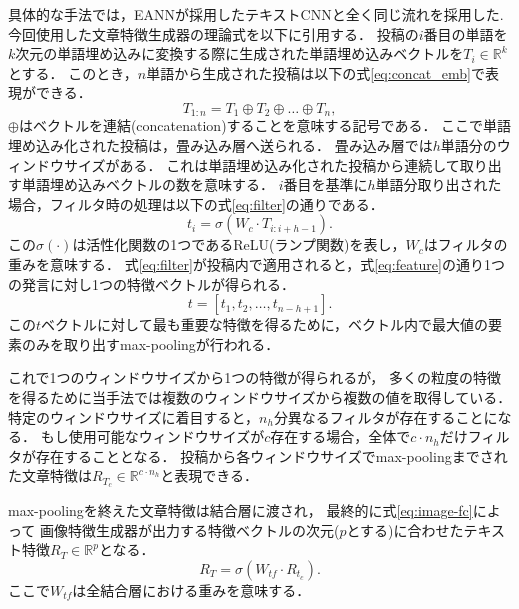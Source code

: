 具体的な手法では，EANNが採用したテキストCNNと全く同じ流れを採用した\cite{Wang:2018:EEA:3219819.3219903}.
今回使用した文章特徴生成器の理論式を以下に引用する．
投稿の$i$番目の単語を$k$次元の単語埋め込みに変換する際に生成された単語埋め込みベクトルを$T_i \in \mathbb{R}^k$とする．
このとき，$n$単語から生成された投稿は以下の式\ref{eq:concat_emb}で表現ができる．
\begin{equation}
    \label{eq:concat_emb}
    T_{1:n} = T_1 \oplus T_2 \oplus \ldots \oplus T_n,
\end{equation}
$\oplus$はベクトルを連結(concatenation)することを意味する記号である．
ここで単語埋め込み化された投稿は，畳み込み層へ送られる．
畳み込み層では$h$単語分のウィンドウサイズがある．
これは単語埋め込み化された投稿から連続して取り出す単語埋め込みベクトルの数を意味する．
$i$番目を基準に$h$単語分取り出された場合，フィルタ時の処理は以下の式\ref{eq:filter}の通りである．
\begin{equation}
    \label{eq:filter}
    t_i = \sigma(W_c \cdot T_{i:i+h-1}).
\end{equation}
この$\sigma(\cdot)$は活性化関数の1つであるReLU(ランプ関数)を表し，$W_c$はフィルタの重みを意味する．
式\ref{eq:filter}が投稿内で適用されると，式\ref{eq:feature}の通り1つの発言に対し1つの特徴ベクトルが得られる．
\begin{equation}
    \label{eq:feature}
    t = [t_1, t_2, \ldots, t_{n-h+1}].
\end{equation}
この$t$ベクトルに対して最も重要な特徴を得るために，ベクトル内で最大値の要素のみを取り出すmax-poolingが行われる．

これで1つのウィンドウサイズから1つの特徴が得られるが，
多くの粒度の特徴を得るために当手法では複数のウィンドウサイズから複数の値を取得している．
特定のウィンドウサイズに着目すると，$n_h$分異なるフィルタが存在することになる．
もし使用可能なウィンドウサイズが$c$存在する場合，全体で$c \cdot n_h$だけフィルタが存在することとなる．
投稿から各ウィンドウサイズでmax-poolingまでされた文章特徴は$R_{T_c} \in \mathbb{R}^{c \cdot n_h}$と表現できる．

max-poolingを終えた文章特徴は結合層に渡され，
最終的に式\ref{eq:image-fc}によって
画像特徴生成器が出力する特徴ベクトルの次元($p$とする)に合わせたテキスト特徴$R_T \in \mathbb{R}^p$となる．
\begin{equation}
    \label{eq:image-fc}
    R_T = \sigma(W_{tf} \cdot R_{t_c}).
\end{equation}
ここで$W_{tf}$は全結合層における重みを意味する．
%
